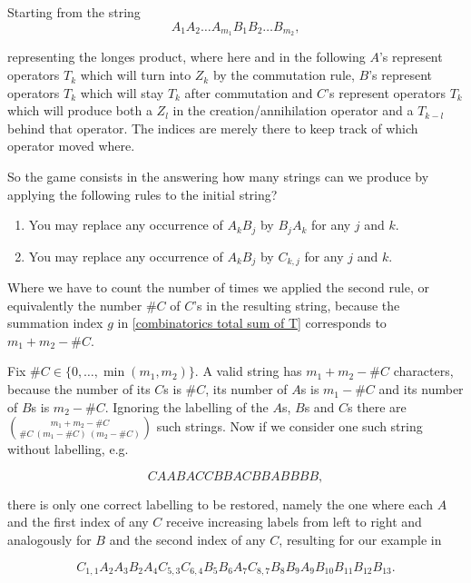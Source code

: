 \documentclass[b5paper,draft,openbib,12pt]{memoir}
\begin{document}
Starting from the string 
\begin{equation}
A_1A_2\dots A_{m_1} B_1 B_2 \dots B_{m_2},
\end{equation}

representing the longes product, where here and in the following \(A\)'s
represent operators \(T_k\) which will turn into \(Z_k\) by the commutation rule,
\(B\)'s represent operators \(T_k\) which will stay \(T_k\) after commutation and
\(C\)'s represent operators \(T_k\) which will produce both a \(Z_l\) in the creation/annihilation
operator and a \(T_{k-l}\) behind that operator. The indices are merely there to keep track of
which operator moved where.

So the game consists in the answering how many strings can we produce by 
applying the following rules to the initial string?
\begin{enumerate}
\item You may replace any occurrence of \(A_k B_j\) by \(B_j A_k\) for any \(j\) and \(k\).
\item You may replace any occurrence of \(A_k B_j\) by \(C_{k,j}\) for any \(j\) and \(k\).
\end{enumerate}
Where we have to count the number of times we applied the second rule, or equivalently
the number \(\#C\) of \(C\)'s in the resulting string, because the summation index \(g\) in 
\eqref{combinatorics total sum of T} corresponds to \(m_1+m_2-\#C\). 

Fix \(\#C \in\{0,\dots ,\min(m_1,m_2)\}\). A valid string has \(m_1+m_2-\#C\) characters,
because the number of its \(C\)s is \(\#C\), its number of \(A\)s is \(m_1-\#C\) and 
its number of \(B\)s is \(m_2-\#C\). Ignoring the labelling of the \(A\)s, \(B\)s and \(C\)s 
there are \(\binom{m_1+m_2-\#C}{\#C \ (m_1 - \#C) \ (m_2-\#C)}\) such strings. Now if
we consider one such string without labelling, e.g.

\begin{equation}
C A A B A C C B B A C B B A B B B B,
\end{equation}

there is only one correct labelling to be restored, namely the one where each \(A\) and the first index of 
any \(C\)  receive increasing labels from left to right and analogously for \(B\) and the second 
 index of any \(C\), resulting for our example in
 
\begin{equation}
 C_{1,1} A_2 A_3 B_2 A_4 C_{5,3} C_{6,4} B_{5} B_6 A_7 C_{8,7} B_8 B_9 A_9 B_{10} B_{11} B_{12} B_{13}.
\end{equation}
\end{document}
